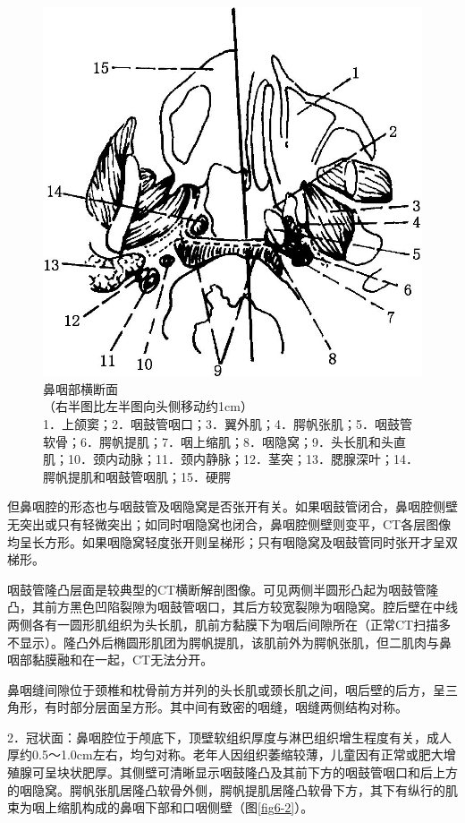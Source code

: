 \begin{figure}[!htbp]
 \centering
 \includegraphics[width=.7\textwidth,height=\textheight,keepaspectratio]{./images/Image00134.jpg}
 \captionsetup{justification=centering}
 \caption{鼻咽部横断面\\{\small （右半图比左半图向头侧移动约1cm）}\\{\small 1．上颌窦；2．咽鼓管咽口；3．翼外肌；4．腭帆张肌；5．咽鼓管软骨；6．腭帆提肌；7．咽上缩肌；8．咽隐窝；9．头长肌和头直肌；10．颈内动脉；11．颈内静脉；12．茎突；13．腮腺深叶；14．腭帆提肌和咽鼓管咽肌；15．硬腭}}
 \label{fig6-1}
  \end{figure} 

但鼻咽腔的形态也与咽鼓管及咽隐窝是否张开有关。如果咽鼓管闭合，鼻咽腔侧壁无突出或只有轻微突出；如同时咽隐窝也闭合，鼻咽腔侧壁则变平，CT各层图像均呈长方形。如果咽隐窝轻度张开则呈梯形；只有咽隐窝及咽鼓管同时张开才呈双梯形。

咽鼓管隆凸层面是较典型的CT横断解剖图像。可见两侧半圆形凸起为咽鼓管隆凸，其前方黑色凹陷裂隙为咽鼓管咽口，其后方较宽裂隙为咽隐窝。腔后壁在中线两侧各有一圆形肌组织为头长肌，肌前方黏膜下为咽后间隙所在（正常CT扫描多不显示）。隆凸外后椭圆形肌团为腭帆提肌，该肌前外为腭帆张肌，但二肌肉与鼻咽部黏膜融和在一起，CT无法分开。

鼻咽缝间隙位于颈椎和枕骨前方并列的头长肌或颈长肌之间，咽后壁的后方，呈三角形，有时部分层面呈方形。其中间有致密的咽缝，咽缝两侧结构对称。

2．冠状面：鼻咽腔位于颅底下，顶壁软组织厚度与淋巴组织增生程度有关，成人厚约0.5～1.0cm左右，均匀对称。老年人因组织萎缩较薄，儿童因有正常或肥大增殖腺可呈块状肥厚。其侧壁可清晰显示咽鼓隆凸及其前下方的咽鼓管咽口和后上方的咽隐窝。腭帆张肌居隆凸软骨外侧，腭帆提肌居隆凸软骨下方，其下有纵行的肌束为咽上缩肌构成的鼻咽下部和口咽侧壁（图\ref{fig6-2}）。

